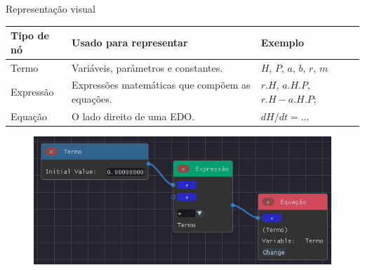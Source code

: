 \begin{frame}{Representação visual}
    \begin{table}
        \begin{center}
        \begin{tabular}{ m{}m{}m{} }
            \toprule
            Tipo de nó & Usado para representar & Exemplo \\
            \midrule
            Termo & Variáveis, parâmetros e constantes. & $H$, $P$, $a$, $b$, $r$, $m$ \\
            Expressão & Expressões matemáticas que compõem as equações. & \(r.H\), \(a.H.P\), \(r.H - a.H.P\);\\
            Equação & O lado direito de uma EDO. & \(dH/dt = ...\) \\
            \bottomrule
        \end{tabular}
        \end{center}
    \end{table}
    \begin{figure}
        \centering
        \includegraphics[width=.6\textwidth]{contents/imgs/ode-designer/tipos-nos-slim.png}
    \end{figure}
\end{frame}






